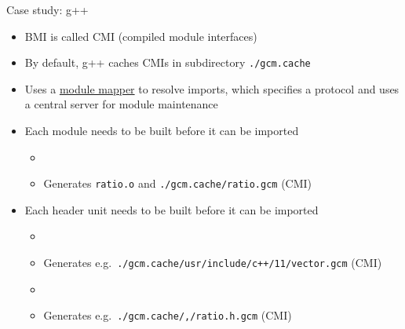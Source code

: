 \begin{frame}[fragile]
    \begin{block}{Case study: g++}
      \begin{itemize}
        \item BMI is called CMI (compiled module interfaces)
        \item By default, g++ caches CMIs in subdirectory \texttt{./gcm.cache}
        \item Uses a \href{https://wg21.link/P1184}{module mapper} to resolve imports, which specifies a protocol and uses a central server for module maintenance
        \item Each module needs to be built before it can be imported
        \begin{itemize}
          \item {\footnotesize {}}
          \item Generates \texttt{ratio.o} and \texttt{./gcm.cache/ratio.gcm} (CMI)
        \end{itemize}
        \item Each header unit needs to be built before it can be imported
        \begin{itemize}
          \item {\footnotesize {}}
          \item Generates e.g.\ \texttt{./gcm.cache/usr/include/c++/11/vector.gcm} (CMI)
          \item {\footnotesize {}}
          \item Generates e.g.\ \texttt{./gcm.cache/,/ratio.h.gcm} (CMI)
        \end{itemize}
      \end{itemize}
    \end{block}
\end{frame}

